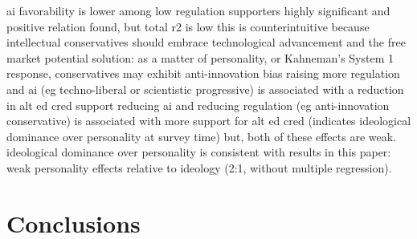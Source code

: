 \documentclass[review]{elsarticle}
\begin{document}
ai favorability is lower among low regulation supporters
highly significant and positive relation found, but total r2 is low
this is counterintuitive because intellectual conservatives should embrace technological advancement and the free market
potential solution: as a matter of personality, or Kahneman's System 1 response, conservatives may exhibit anti-innovation bias
raising more regulation and ai (eg techno-liberal or scientistic progressive) is associated with a reduction in alt ed cred support
reducing ai and reducing regulation (eg anti-innovation conservative) is associated with more support for alt ed cred (indicates ideological dominance over personality at survey time)
but, both of these effects are weak.
ideological dominance over personality is consistent with results in this paper: weak personality effects relative to ideology (2:1, without multiple regression).


\section{Conclusions}




\end{document}
